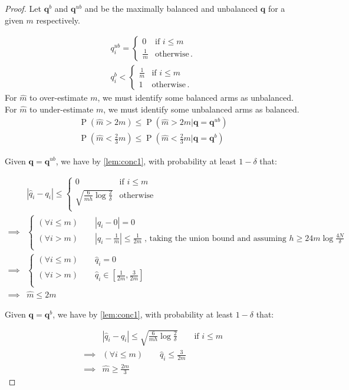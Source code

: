 \documentclass{article}
\newcommand{\eq}[1]{\begin{align*}#1\end{align*}}
\renewcommand{\P}[1]{\operatorname{P}\left(#1\right)}
\theoremstyle{plain}
\theoremstyle{definition}
\begin{document}
\begin{proof}

Let $\boldsymbol{q}^b$ and $\boldsymbol{q}^{ub}$ and be the maximally balanced and unbalanced $\boldsymbol{q}$ for a given $m$ respectively.

\eq{
q^{ub}_i = \begin{cases}
0 & \text{if } i \leq m \\
\frac{1}{m} & \text{otherwise}\,.
\end{cases}\\
q^b_i < \begin{cases}
\frac{1}{m} & \text{if } i \leq m \\
1 & \text{otherwise}\,.
\end{cases}  
}
For $\hat{m}$ to over-estimate $m$, we must identify some balanced arms as unbalanced. For $\hat{m}$ to under-estimate $m$, we must identify some unbalanced arms as balanced.
\eq{
\P{\hat m > 2m} \leq \P{\hat m > 2m|\boldsymbol{q} = \boldsymbol{q}^{ub}}\\
\P{\hat m < \frac{2}{3}m} \leq \P{\hat m < \frac{2}{3}m|\boldsymbol{q} = \boldsymbol{q}^{b}}
}

Given $\boldsymbol{q} = \boldsymbol{q}^{ub}$, we have by \cref{lem:conc1}, with probability at least $1 - \delta$ that: 

\eq{
& \left| \hat q_i - q_i\right| 
 \leq \begin{cases}
0 & \text{if } i \leq m\\
\sqrt{\frac{6}{mh} \log\frac{2}{\delta}} & \text{otherwise} \\
\end{cases}\\
\implies &
\begin{cases}
(\forall i \leq m) \qquad \left| \hat q_i - 0\right| = 0 \\
(\forall i > m) \qquad \left| \hat q_i - \frac{1}{m}\right| \leq \frac{1}{2m} \; \text{, taking the union bound and assuming } h \geq 24m \log\frac{4N}{\delta}\\
\end{cases}\\
\implies &
\begin{cases}
(\forall i \leq m) \qquad  \hat q_i  = 0 \\
(\forall i > m) \qquad \hat q_i \in [\frac{1}{2m}, \frac{3}{2m}]\\
\end{cases}\\
\implies & \hat{m} \leq 2m
}

Given $\boldsymbol{q} = \boldsymbol{q}^{b}$, we have by \cref{lem:conc1}, with probability at least $1 - \delta$ that: 

\eq{
& \left| \hat q_i - q_i\right| 
 \leq \sqrt{\frac{6}{mh} \log\frac{2}{\delta}} \qquad \text{if } i \leq m \\
\implies &
(\forall i \leq m) \qquad  \hat q_i \leq \frac{3}{2m} \\
\implies & \hat{m} \geq \frac{2m}{3}
}

\end{proof}
\end{document}
